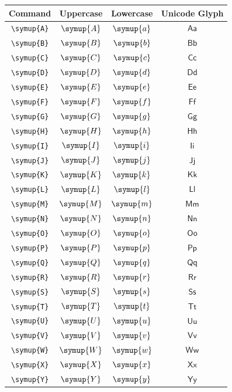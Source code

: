 \documentclass[12pt,a4paper]{article}
\begin{document}
\begin{longtable}{|c|c|c|c|}
\hline
\textbf{Command} & \textbf{Uppercase} & \textbf{Lowercase} & \textbf{Unicode Glyph} \\
\hline
\verb|\symup{A}| & $\symup{A}$ & $\symup{a}$ & $ 𝖠 𝖺 $ \\
\verb|\symup{B}| & $\symup{B}$ & $\symup{b}$ & $ 𝖡 𝖻 $ \\
\verb|\symup{C}| & $\symup{C}$ & $\symup{c}$ & $ 𝖢 𝖼 $ \\
\verb|\symup{D}| & $\symup{D}$ & $\symup{d}$ & $ 𝖣 𝖽 $ \\
\verb|\symup{E}| & $\symup{E}$ & $\symup{e}$ & $ 𝖤 𝖾 $ \\
\verb|\symup{F}| & $\symup{F}$ & $\symup{f}$ & $ 𝖥 𝖿 $ \\
\verb|\symup{G}| & $\symup{G}$ & $\symup{g}$ & $ 𝖦 𝗀 $ \\
\verb|\symup{H}| & $\symup{H}$ & $\symup{h}$ & $ 𝖧 𝗁 $ \\
\verb|\symup{I}| & $\symup{I}$ & $\symup{i}$ & $ 𝖨 𝗂 $ \\
\verb|\symup{J}| & $\symup{J}$ & $\symup{j}$ & $ 𝖩 𝗃 $ \\
\verb|\symup{K}| & $\symup{K}$ & $\symup{k}$ & $ 𝖪 𝗄 $ \\
\verb|\symup{L}| & $\symup{L}$ & $\symup{l}$ & $ 𝖫 𝗅 $ \\
\verb|\symup{M}| & $\symup{M}$ & $\symup{m}$ & $ 𝖬 𝗆 $ \\
\verb|\symup{N}| & $\symup{N}$ & $\symup{n}$ & $ 𝖭 𝗇 $ \\
\verb|\symup{O}| & $\symup{O}$ & $\symup{o}$ & $ 𝖮 𝗈 $ \\
\verb|\symup{P}| & $\symup{P}$ & $\symup{p}$ & $ 𝖯 𝗉 $ \\
\verb|\symup{Q}| & $\symup{Q}$ & $\symup{q}$ & $ 𝖰 𝗊 $ \\
\verb|\symup{R}| & $\symup{R}$ & $\symup{r}$ & $ 𝖱 𝗋 $ \\
\verb|\symup{S}| & $\symup{S}$ & $\symup{s}$ & $ 𝖲 𝗌 $ \\
\verb|\symup{T}| & $\symup{T}$ & $\symup{t}$ & $ 𝖳 𝗍 $ \\
\verb|\symup{U}| & $\symup{U}$ & $\symup{u}$ & $ 𝖴 𝗎 $ \\
\verb|\symup{V}| & $\symup{V}$ & $\symup{v}$ & $ 𝖵 𝗏 $ \\
\verb|\symup{W}| & $\symup{W}$ & $\symup{w}$ & $ 𝖶 𝗐 $ \\
\verb|\symup{X}| & $\symup{X}$ & $\symup{x}$ & $ 𝖷 𝗑 $ \\
\verb|\symup{Y}| & $\symup{Y}$ & $\symup{y}$ & $ 𝖸 𝗒 $ \\

\end{longtable}
\end{document}
